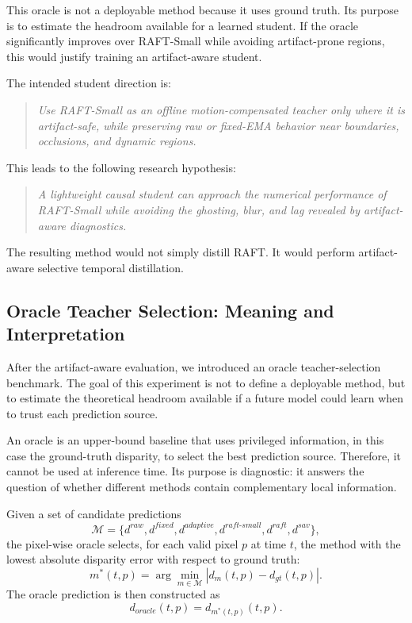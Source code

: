 \documentclass[11pt,a4paper]{article}
\begin{document}
This oracle is not a deployable method because it uses ground truth. Its purpose is to estimate the headroom available for a learned student. If the oracle significantly improves over RAFT-Small while avoiding artifact-prone regions, this would justify training an artifact-aware student.

The intended student direction is:

\begin{quote}
\emph{Use RAFT-Small as an offline motion-compensated teacher only where it is artifact-safe, while preserving raw or fixed-EMA behavior near boundaries, occlusions, and dynamic regions.}
\end{quote}

This leads to the following research hypothesis:

\begin{quote}
\emph{A lightweight causal student can approach the numerical performance of RAFT-Small while avoiding the ghosting, blur, and lag revealed by artifact-aware diagnostics.}
\end{quote}

The resulting method would not simply distill RAFT. It would perform artifact-aware selective temporal distillation.

\subsection{Oracle Teacher Selection: Meaning and Interpretation}

After the artifact-aware evaluation, we introduced an oracle teacher-selection benchmark. The goal of this experiment is not to define a deployable method, but to estimate the theoretical headroom available if a future model could learn when to trust each prediction source.

An oracle is an upper-bound baseline that uses privileged information, in this case the ground-truth disparity, to select the best prediction source. Therefore, it cannot be used at inference time. Its purpose is diagnostic: it answers the question of whether different methods contain complementary local information.

Given a set of candidate predictions
\[
\mathcal{M}
=
\{
d^{raw},
d^{fixed},
d^{adaptive},
d^{raft\text{-}small},
d^{raft},
d^{sav}
\},
\]
the pixel-wise oracle selects, for each valid pixel \(p\) at time \(t\), the method with the lowest absolute disparity error with respect to ground truth:
\[
m^*(t,p)
=
\arg\min_{m \in \mathcal{M}}
\left|
d_m(t,p) - d_{gt}(t,p)
\right|.
\]
The oracle prediction is then constructed as
\[
d_{oracle}(t,p)
=
d_{m^*(t,p)}(t,p).
\]
\end{document}
